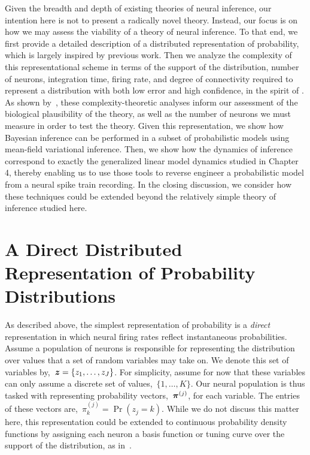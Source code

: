 Given the breadth and depth of existing theories of neural inference,
our intention here is not to present a radically novel
theory. Instead, our focus is on how we may assess the viability of a
theory of neural inference. To that end, we first provide a detailed
description of a distributed representation of probability, which is
largely inspired by previous work.  Then we analyze the complexity of
this representational scheme in terms of the support of the
distribution, number of neurons, integration time, firing rate, and
degree of connectivity required to represent a distribution with both
low error and high confidence, in the spirit of
\citet{valiant1994circuits, valiant2005memorization}.  As shown
by~\citet{gao2015simplicity}, these complexity-theoretic analyses
inform our assessment of the biological plausibility of the theory, as
well as the number of neurons we must measure in order to test the
theory. Given this representation, we show how Bayesian inference can
be performed in a subset of probabilistic models using mean-field
variational inference. Then, we show how the dynamics of inference
correspond to exactly the generalized linear model dynamics studied in
Chapter 4, thereby enabling us to use those tools to reverse engineer
a probabilistic model from a neural spike train recording.  In the
closing discussion, we consider how these techniques could be extended
beyond the relatively simple theory of inference studied here.

\section{A Direct Distributed Representation of Probability Distributions}
\label{sec:representation}


\sloppy
As described above, the simplest representation of probability is a \emph{direct}
representation in which neural firing rates reflect instantaneous
probabilities. Assume a population of neurons is responsible for
representing the distribution over values that a set of random
variables may take on. We denote this set of variables 
by,~${\boldsymbol{z} = \{z_1, \ldots, z_J\}}$.  For
simplicity, assume for now that these variables can only assume a
discrete set of values,~${\{1, \ldots, K\}}$.  Our
neural population is thus tasked with representing probability
vectors,~$\boldsymbol{\pi}^{(j)}$, for each 
variable. The entries of these vectors are,~${\pi^{(j)}_k = \Pr(z_j=k)}$.
While we do not discuss this matter here, this representation could
be extended to continuous probability density functions by assigning
each neuron a basis function or tuning curve over the support of the
distribution, as in~\cite{Barber2003, Ma2006, beck2007exact}. 

